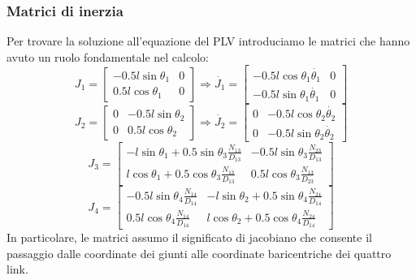 \subsubsection{Matrici di inerzia}
Per trovare la soluzione all'equazione del PLV introduciamo le matrici che hanno avuto un ruolo fondamentale nel calcolo:
\begin{equation*}
    J_1 = \begin{bmatrix}
     -0.5l\sin\theta_1 & 0 \\ 0.5l\cos\theta_1 & 0
    \end{bmatrix} \Rightarrow
    \dot{J_1} = \begin{bmatrix}
     -0.5l\cos\theta_1\dot{\theta_1} & 0 \\ -0.5l\sin\theta_1\dot{\theta_1} & 0
    \end{bmatrix}
\end{equation*}
\begin{equation*}
    J_2 = \begin{bmatrix}
           0 & -0.5l\sin\theta_2 \\
           0 & 0.5l\cos\theta_2 
           \end{bmatrix}
           \Rightarrow
   \dot{J_2} = \begin{bmatrix} 0 & -0.5l\cos\theta_2\dot{\theta_2} \\
           0 & -0.5l\sin\theta_2\dot{\theta_2}
           \end{bmatrix}
\end{equation*}
\begin{equation*}
    J_3 = \begin{bmatrix}
    -l\sin\theta_1+0.5\sin\theta_3 \frac{N_{13}}{D_{13}} & 
    -0.5l\sin\theta_3 \frac{N_{23}}{D_{13}} \\
    l\cos\theta_1+0.5\cos\theta_3 \frac{N_{13}}{D_{13}} & 
    0.5l\cos\theta_3 \frac{N_{13}}{D_{23}}
    \end{bmatrix}
\end{equation*}
\begin{equation*}
    J_4 = \begin{bmatrix}
    -0.5l\sin\theta_4 \frac{N_{14}}{D_{14}} &
    -l\sin\theta_2+0.5\sin\theta_4\frac{N_{24}}{D_{14}} \\
    0.5l\cos\theta_4\frac{N_{14}}{D_{14}} &
    l\cos\theta_2+0.5\cos\theta_4 \frac{N_{24}}{D_{14}}
    \end{bmatrix}
\end{equation*}
In particolare, le matrici assumo il significato di jacobiano che consente il passaggio dalle coordinate dei giunti alle coordinate baricentriche dei quattro link. 
